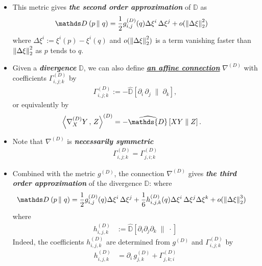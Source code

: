 \documentclass[11pt]{article}
\begin{document}
\begin{itemize}
\item This metric gives \emph{\textbf{the second order approximation}} of  $\mathds{D}$ as
\begin{align}
\divg{}{p}{q} &= \frac{1}{2}g_{i,j}^{(D)}(q)\Delta\xi^i\,\Delta\xi^j + o(\norm{\Delta \xi}{2}^2)
\end{align} where $\Delta \xi^i := \xi^i(p) - \xi^i(q)$ and $ o(\left\|\Delta \xi\right\|_{2}^2)$ is a term vanishing faster than $\left\|\Delta \xi\right\|_{2}^2$ as $p$ tends to $q$.




\item Given a \emph{\textbf{divergence}} $\mathds{D}$, we can also define \underline{\emph{\textbf{an affine connection}}} $\nabla^{(D)}$ with coefficients $\Gamma_{i,j; k}^{(D)}$ by
\begin{align}
\Gamma_{i,j; k}^{(D)} := -\widehat{\mathds{D}}\left[ \partial_i\,\partial_j \;\|\;  \partial_k \right], \label{eqn: coefficient_affine_connection_by_divergence}
\end{align}
or equivalently by
\begin{align}
\inn{\nabla^{(D)}_{X}{Y}}{Z}^{(D)} &= - \widehat{\mathds{D}}\left[ XY \;\|\;  Z \right].  \label{eqn: affine_connection_by_divergence_inn}
\end{align}

\item Note that  $\nabla^{(D)}$ is \emph{\textbf{necessarily symmetric}} 
\begin{align*}
\Gamma_{i,j; k}^{(D)}  = \Gamma_{j,i; k}^{(D)}
\end{align*}

\item Combined with the metric $g^{(D)}$, the connection $\nabla^{(D)}$ gives \emph{\textbf{the third order approximation}} of the divergence $\mathds{D}$: where
\begin{align}
\divg{}{p}{q} &= \frac{1}{2}g_{i,j}^{(D)}(q)\Delta\xi^i\,\Delta\xi^j + \frac{1}{6}h_{i,j,k}^{(D)}(q)\Delta\xi^i\,\Delta\xi^j\Delta\xi^k + o(\norm{\Delta \xi}{2}^3) \label{eqn: divergence_3rd_order_approx}
\end{align} where 
\begin{align}
h_{i,j,k}^{(D)} &:=  \widehat{\mathds{D}}\left[ \partial_i \partial_j \partial_k \;\|\; \cdot \right]  \label{eqn: divergence_3rd_order_coefficient}
\end{align}
Indeed, the coefficients $h_{i,j,k}^{(D)}$ are determined from $g^{(D)}$ and $\Gamma_{i,j; k}^{(D)}$ by
\begin{align*}
h_{i,j,k}^{(D)} &= \partial_i\,g_{j,k}^{(D)} + \Gamma_{j,k; i}^{(D)}
\end{align*}





\end{itemize}
\end{document}
